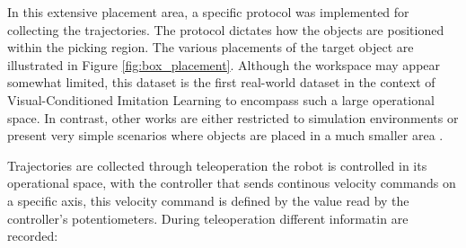 In this extensive placement area, a specific protocol was implemented for collecting the trajectories. The protocol dictates how the objects are positioned within the picking region. The various placements of the target object are illustrated in Figure \ref{fig:box_placement}. Although the workspace may appear somewhat limited, this dataset is the first real-world dataset in the context of Visual-Conditioned Imitation Learning to encompass such a large operational space. In contrast, other works are either restricted to simulation environments \cite{dasari2021transformers_one_shot,mandi2022towards_more_generalizable_one_shot} or present very simple scenarios where objects are placed in a much smaller area \cite{mandlekar2022matters}.

Trajectories are collected through teleoperation the robot is controlled in its operational space, with the controller that sends continous velocity commands on a specific axis, this velocity command is defined by the value read by the controller's potentiometers.
During teleoperation different informatin are recorded:
